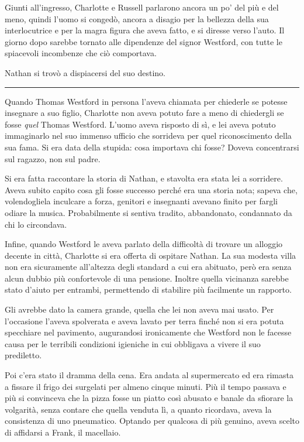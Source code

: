 \documentclass[a4paper,oneside,11pt]{memoir}
\begin{document}
Giunti all'ingresso, Charlotte e Russell parlarono ancora un po' del più e del
meno, quindi l'uomo si congedò, ancora a disagio per la bellezza della sua
interlocutrice e per la magra figura che aveva fatto, e si diresse verso l'auto.
Il giorno dopo sarebbe tornato alle dipendenze del signor Westford, con tutte le
spiacevoli incombenze che ciò comportava.

Nathan si trovò a dispiacersi del suo destino.

\plainbreak{1}

Quando Thomas Westford in persona l'aveva chiamata per chiederle se potesse
insegnare a suo figlio, Charlotte non aveva potuto fare a meno di chiedergli se
fosse \emph{quel} Thomas Westford. L'uomo aveva risposto di sì, e lei aveva
potuto immaginarlo nel suo immenso ufficio che sorrideva per quel riconoscimento
della sua fama. Si era data della stupida: cosa importava chi fosse? Doveva
concentrarsi sul ragazzo, non sul padre.

Si era fatta raccontare la storia di Nathan, e stavolta era stata lei a
sorridere. Aveva subito capito cosa gli fosse successo perché era una storia
nota; sapeva che, volendogliela inculcare a forza, genitori e insegnanti avevano
finito per fargli odiare la musica. Probabilmente si sentiva tradito,
abbandonato, condannato da chi lo circondava.

Infine, quando Westford le aveva parlato della difficoltà di trovare un alloggio
decente in città, Charlotte si era offerta di ospitare Nathan. La sua modesta
villa non era sicuramente all'altezza degli standard a cui era abituato, però
era senza alcun dubbio più confortevole di una pensione. Inoltre quella
vicinanza sarebbe stato d'aiuto per entrambi, permettendo di stabilire più
facilmente un rapporto.

Gli avrebbe dato la camera grande, quella che lei non aveva mai usato. Per
l'occasione l'aveva spolverata e aveva lavato per terra finché non si era potuta
specchiare nel pavimento, augurandosi ironicamente che Westford non le facesse
causa per le terribili condizioni igieniche in cui obbligava a vivere il suo
prediletto.

Poi c'era stato il dramma della cena. Era andata al supermercato ed era rimasta
a fissare il frigo dei surgelati per almeno cinque minuti. Più il tempo passava
e più si convinceva che la pizza fosse un piatto così abusato e banale da
sfiorare la volgarità, senza contare che quella venduta lì, a quanto ricordava,
aveva la consistenza di uno pneumatico. Optando per qualcosa di più genuino,
aveva scelto di affidarsi a Frank, il macellaio.
\end{document}
